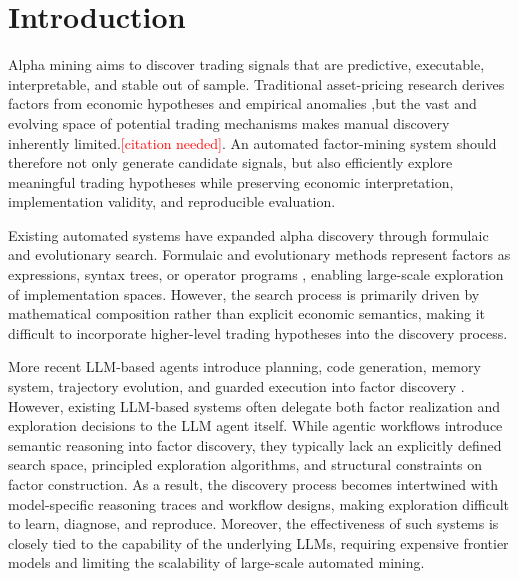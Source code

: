 \section{Introduction}
\label{sec:introduction}

Alpha mining aims to discover trading signals that are predictive, executable, interpretable, and stable out of sample. Traditional asset-pricing research derives factors from economic hypotheses and
empirical anomalies \cite{sharpe1964capital,fama1992cross,fama1993common},but the vast and evolving space of
potential trading mechanisms makes manual discovery inherently limited.\textcolor{red}{[citation needed]}. An automated factor-mining system should therefore not only generate candidate signals, but also efficiently explore meaningful trading hypotheses while preserving economic interpretation, implementation validity, and reproducible evaluation.

Existing automated systems have expanded alpha discovery through formulaic and evolutionary search. Formulaic and evolutionary methods represent factors as expressions, syntax trees, or operator programs \cite{kakushadze2016formulaic,koza1992genetic,su2022genetic,zhang2020autoalpha,cui2021alphaevolve,yu2023alphagen,shi2025alphaforge}, enabling large-scale exploration of implementation spaces. However, the search process is primarily driven by mathematical composition rather than explicit economic semantics, making it difficult to
incorporate higher-level trading hypotheses into the discovery process. 

More recent LLM-based agents introduce planning, code generation, memory system, trajectory evolution, and guarded execution into factor discovery \cite{li2024can,tang2025alphaagent,shi2025navigating,lin2026factorengine,han2026quantaalpha,shi2026hubble,liu2025cogalpha,chen2025alphasage}. However, existing LLM-based systems often delegate both factor realization and exploration decisions to the LLM agent itself. While agentic workflows introduce semantic reasoning into factor discovery, they typically lack an explicitly defined search space, principled exploration algorithms, and structural constraints on factor construction. As a result, the discovery process becomes intertwined with model-specific reasoning traces and workflow designs, making exploration difficult to learn, diagnose, and reproduce. Moreover, the effectiveness of such systems is closely tied to the capability of the underlying LLMs, requiring expensive frontier models and limiting the scalability of large-scale automated mining.

